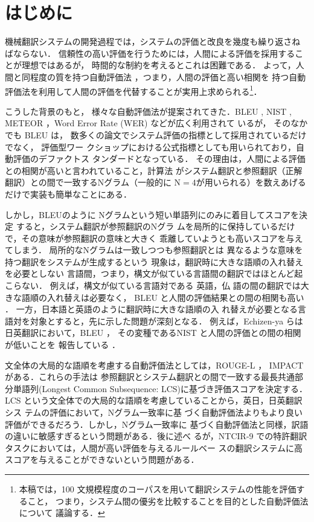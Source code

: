 \documentclass[japanese]{jnlp_1.4}
\begin{document}
\maketitle


\section{はじめに}

機械翻訳システムの開発過程では，システムの評価と改良を幾度も繰り返さね
ばならない．
信頼性の高い評価を行うためには，人間による評価を採用することが理想ではあるが，
時間的な制約を考えるとこれは困難である．
よって，人間と同程度の質を持つ自動評価法
，つまり，人間の評価と高い相関を
持つ自動評価法を利用して人間の評価を代替することが実用上求められる\footnote{
本稿では，100 文規模程度のコーパスを用いて翻訳システムの性能を評価すること，
つまり，システム間の優劣を比較することを目的とした自動評価法について
議論する．}．

こうした背景のもと，
様々な自動評価法が提案されてきた．BLEU \cite{bleu}, NIST \cite{nist},
METEOR \cite{meteor}，Word Error Rate (WER) \cite{WER} などが広く利用されて
いるが，
そのなかでも BLEU \cite{bleu} は，
数多くの論文でシステム評価の指標として採用されているだけでなく，
評価型ワー
クショップにおける公式指標としても用いられており，自動評価のデファクトス
タンダードとなっている．
その理由は，人間による評価との相関が高いと言われていること，計算法
がシステム翻訳と参照翻訳（正解翻訳）との間で一致するNグラム（一般的に
$\mathrm{N}=4$が用いられる）を数えあげるだけで実装も簡単なことにある．

しかし，BLEUのように Nグラムという短い単語列にのみに着目してスコアを決定
すると，システム翻訳が参照翻訳のNグラ
ムを局所的に保持しているだけで，その意味が参照翻訳の意味と大きく
乖離していようとも高いスコアを与えてしまう．
局所的なNグラムは一致しつつも参照翻訳とは
異なるような意味を持つ翻訳をシステムが生成するという
現象は，翻訳時に大きな語順の入れ替えを必要としない
言語間，つまり，構文が似ている言語間の翻訳ではほとんど起こらない．
例えば，構文が似ている言語対である
英語，仏
語の間の翻訳では大きな語順の入れ替えは必要なく，
BLEU と人間の評価結果との間の相関も高い \cite{bleu}．
一方，日本語と英語のように翻訳時に大きな語順の入
れ替えが必要となる言語対を対象とすると，先に示した問題が深刻となる．
例えば，Echizen-ya らは日英翻訳において，BLEU \cite{bleu}，
その変種であるNIST \cite{nist}と人間の評価との間の相関が低いことを
報告している \cite{echizenya-wpt09}．

文全体の大局的な語順を考慮する自動評価法としては，ROUGE-L \cite{ROUGEL}，
IMPACT \cite{impact}がある．これらの手法は
参照翻訳とシステム翻訳との間で一致する最長共通部分単語列(Longest
Common Subsequence: LCS)に基づき評価スコアを決定する．
LCS という文全体での大局的な語順を考慮していることから，英日，日英翻訳シス
テムの評価において，Nグラム一致率に基
づく自動評価法よりもより良い評価ができるだろう．しかし，Nグラム一致率に
基づく自動評価法と同様，訳語の違いに敏感すぎるという問題がある．後に述べ
るが，NTCIR-9 での特許翻訳タスクにおいては，人間が高い評価を与えるルールベー
スの翻訳システムに高スコアを与えることができないという問題がある．
\end{document}
